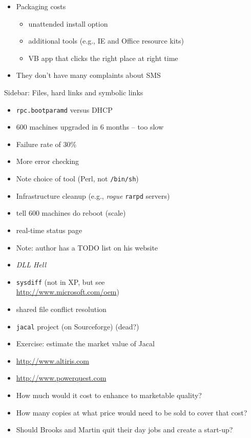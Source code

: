 \documentclass{slides}
\newcommand{\bi}{\begin{itemize}}
\newcommand{\ei}{\end{itemize}}
\begin{document}
\bi
\item Packaging costs
	\bi
		\item unattended install option
		\item additional tools (e.g., IE and Office resource kits)
		\item VB app that clicks the right place at right time
	\ei
\item They don't have many complaints about SMS
\ei

Sidebar: Files, hard links and symbolic links


\bi
\item {\tt rpc.bootparamd} versus DHCP
\item 600 machines upgraded in 6 months -- too slow
\item Failure rate of 30\%
\ei


\bi
\item More error checking
\item Note choice of tool (Perl, not {\tt /bin/sh})
\item Infrastructure cleanup (e.g., \emph{rogue} {\tt rarpd} servers)
\item tell 600 machines do reboot (scale)
\item real-time status page
\item Note: author has a TODO list on his website
\ei


\bi
\item \emph{DLL Hell}
\item {\tt sysdiff} (not in XP, but see \\
	\url{http://www.microsoft.com/oem})
\item shared file conflict resolution
\item {\tt jacal} project (on Sourceforge) (dead?)
\ei


\bi
\item Exercise: estimate the market value of Jacal
\item \url{http://www.altiris.com}
\item \url{http://www.powerquest.com}
\item How much would it cost to enhance to marketable
	quality?
\item How many copies at what price would need to
	be sold to cover that cost?
\item Should Brooks and Martin quit their day jobs and
	create a start-up?
\ei
\end{document}
